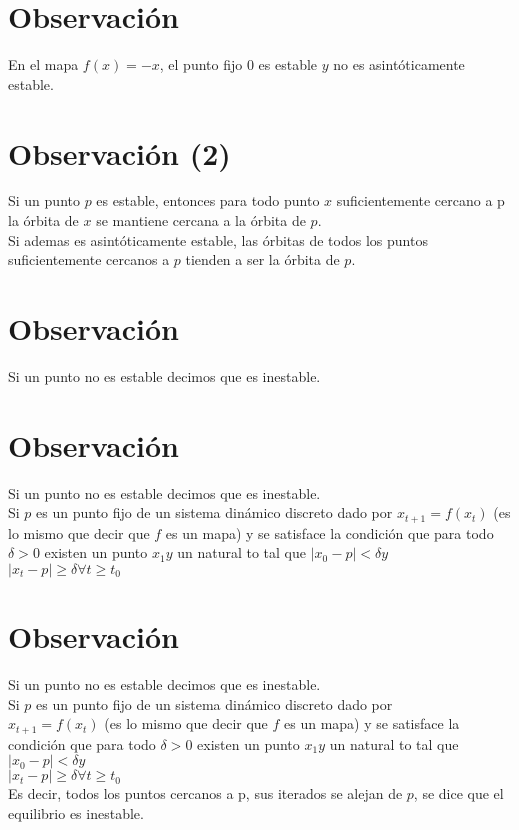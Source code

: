 \documentclass[11pt]{beamer}
\begin{document}
\section*{Observación}
En el mapa $f(x)=-x$, el punto fijo 0 es estable $y$ no es asintóticamente estable.

\section*{Observación (2)}
Si un punto $p$ es estable, entonces para todo punto $x$ suficientemente cercano a p la órbita de $x$ se mantiene cercana a la órbita de $p$.\\
Si ademas es asintóticamente estable, las órbitas de todos los puntos suficientemente cercanos a $p$ tienden a ser la órbita de $p$.

\section*{Observación}
Si un punto no es estable decimos que es inestable.

\section*{Observación}
Si un punto no es estable decimos que es inestable.\\
Si $p$ es un punto fijo de un sistema dinámico discreto dado por $x_{t+1}=f\left(x_{t}\right)$ (es lo mismo que decir que $f$ es un mapa) y se satisface la condición que para todo $\delta>0$ existen un punto $x_{1} y$ un natural to tal que $\left|x_{0}-p\right|<\delta y$\\
$\left|x_{t}-p\right| \geq \delta \forall t \geq t_{0}$

\section*{Observación}
Si un punto no es estable decimos que es inestable.\\
Si $p$ es un punto fijo de un sistema dinámico discreto dado por\\
$x_{t+1}=f\left(x_{t}\right)$ (es lo mismo que decir que $f$ es un mapa) y se satisface la condición que para todo $\delta>0$ existen un punto $x_{1} y$ un natural to tal que $\left|x_{0}-p\right|<\delta y$\\
$\left|x_{t}-p\right| \geq \delta \forall t \geq t_{0}$\\
Es decir, todos los puntos cercanos a p, sus iterados se alejan de $p$, se dice que el equilibrio es inestable.
\end{document}

